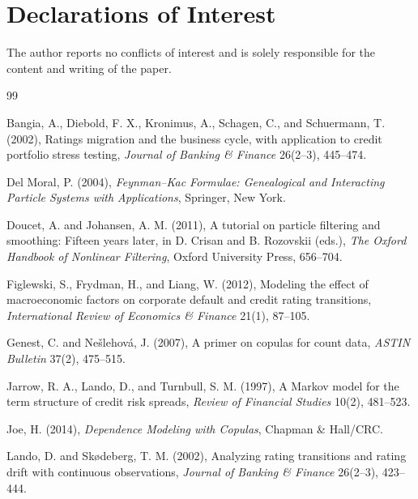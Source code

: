 \documentclass[11pt]{article}
\theoremstyle{definition}
\newcommand{\bmhead}[1]{\par\medskip\noindent\textbf{#1}\par\smallskip}
\begin{document}


\section*{Declarations of Interest}

The author reports no conflicts of interest and is solely responsible for the
content and writing of the paper.

\begin{thebibliography}{99}

Bangia, A., Diebold, F. X., Kronimus, A., Schagen, C., and Schuermann, T. (2002),
Ratings migration and the business cycle, with application to credit portfolio
stress testing,
\emph{Journal of Banking \& Finance} 26(2--3), 445--474.

Del Moral, P. (2004),
\emph{Feynman--Kac Formulae: Genealogical and Interacting Particle Systems with Applications},
Springer, New York.

Doucet, A. and Johansen, A. M. (2011),
A tutorial on particle filtering and smoothing: Fifteen years later,
in D. Crisan and B. Rozovskii (eds.),
\emph{The Oxford Handbook of Nonlinear Filtering},
Oxford University Press, 656--704.

Figlewski, S., Frydman, H., and Liang, W. (2012),
Modeling the effect of macroeconomic factors on corporate default and credit
rating transitions,
\emph{International Review of Economics \& Finance} 21(1), 87--105.

Genest, C. and Ne\v{s}lehov\'{a}, J. (2007),
A primer on copulas for count data,
\emph{ASTIN Bulletin} 37(2), 475--515.

Jarrow, R. A., Lando, D., and Turnbull, S. M. (1997),
A Markov model for the term structure of credit risk spreads,
\emph{Review of Financial Studies} 10(2), 481--523.

Joe, H. (2014),
\emph{Dependence Modeling with Copulas},
Chapman \& Hall/CRC.

Lando, D. and Sk{\o}deberg, T. M. (2002),
Analyzing rating transitions and rating drift with continuous observations,
\emph{Journal of Banking \& Finance} 26(2--3), 423--444.


\end{thebibliography}
\end{document}
